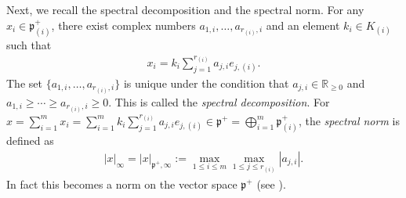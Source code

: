 \documentclass[11pt]{article}
\numberwithin{equation}{section}
\newcommand{\BR}{\mathbb{R}}
\newcommand{\fp}{\mathfrak{p}}
\begin{document}
Next, we recall the spectral decomposition and the spectral norm. For any $x_i\in\fp^+_{(i)}$, there exist complex numbers
$a_{1,i},\ldots, a_{r_{(i)},i}$ and an element $k_i\in K_{(i)}$ such that
\begin{gather*} x_i=k_i\sum_{j=1}^{r_{(i)}} a_{j,i}e_{j,(i)}. \end{gather*}
The set $\{a_{1,i},\ldots,a_{r_{(i)},i}\}$ is unique under the condition that $a_{j,i}\in\BR_{\ge 0}$ and
$a_{1,i}\ge\cdots\ge a_{r_{(i)},i}\ge 0$. This is called the \textit{spectral decomposition}.
For $x=\sum\limits_{i=1}^m x_i=\sum\limits_{i=1}^m k_i\sum\limits_{j=1}^{r_{(i)}}a_{j,i}e_{j,(i)}\in\fp^+=\bigoplus\limits_{i=1}^m \fp^+_{(i)}$,
the \textit{spectral norm} is defined as
\begin{gather}\label{spectral_norm}
|x|_\infty=|x|_{\fp^+,\infty}:=\max_{1\le i\le m}\max_{1\le j\le r_{(i)}}|a_{j,i}|.
\end{gather}
In fact this becomes a norm on the vector space $\fp^+$ (see \cite[Part V, Proposition VI.4.1]{FKKLR}).
\end{document}
